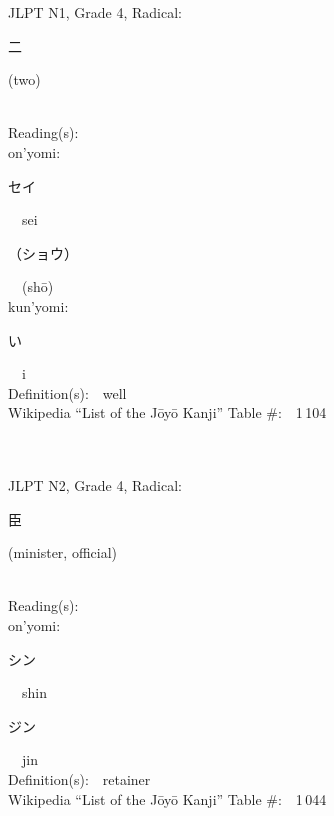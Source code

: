 \begin{multicols}{2}
{JLPT N1, Grade 4, Radical:\ \ {\begin{CJK}{UTF8}{min} 二 \end{CJK}} (two) } \\
Reading(s):\ \ \\
{\hspace*{1em}}on'yomi:\ \ \\
{\hspace*{2em}}{\begin{CJK}{UTF8}{min} セイ \end{CJK}}\ \ sei\ \ \\
{\hspace*{2em}}{\begin{CJK}{UTF8}{min} （ショウ） \end{CJK}}\ \ (sh\=o)\ \ \\
{\hspace*{1em}}kun'yomi:\ \ \\
{\hspace*{2em}}{\begin{CJK}{UTF8}{min} い \end{CJK}}\ \ i\ \ \\
Definition(s):\ \ well \\
Wikipedia ``List of the J\=oy\=o Kanji'' Table \#:\ \ 1\,104 \\
\ \ \\
{\fontsize{34pt}{40pt}  }\ \ \\  %
{JLPT N2, Grade 4, Radical:\ \ {\begin{CJK}{UTF8}{min} 臣 \end{CJK}} (minister, official) } \\
Reading(s):\ \ \\
{\hspace*{1em}}on'yomi:\ \ \\
{\hspace*{2em}}{\begin{CJK}{UTF8}{min} シン \end{CJK}}\ \ shin\ \ \\
{\hspace*{2em}}{\begin{CJK}{UTF8}{min} ジン \end{CJK}}\ \ jin\ \ \\
Definition(s):\ \ retainer \\
Wikipedia ``List of the J\=oy\=o Kanji'' Table \#:\ \ 1\,044 \\

\end{multicols}
